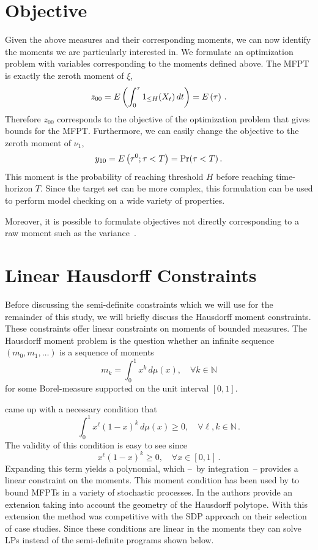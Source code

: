 \section{Objective}
Given the above measures and their corresponding moments, we can
now identify the moments we are particularly interested in.
We formulate an optimization problem with variables corresponding 
to the moments defined above.
The \ac{MFPT} is exactly the zeroth moment of $\xi$,
\[
	z_{00}={E}\left(\int_0^{\tau}1_{\leq H}(X_t)\,dt\right) = {E}\left(\tau\right)\,.
\]
Therefore $z_{00}$ corresponds to the objective of the optimization problem
that gives bounds for the \ac{MFPT}.
Furthermore, we can easily change the objective to the  
zeroth moment of $\nu_1$,
\[
	y_{10} = {E}\left(\tau^0;\tau<T\right)=\Pr(\tau < T)\,.
\]
This moment is the probability of reaching
threshold $H$ before reaching time-horizon $T$. Since the target set can be more complex, this formulation can be used to perform model checking on a
wide variety of properties.

Moreover, it is possible to formulate objectives not directly corresponding to
a raw moment such as the variance~\parencite{sakurai2019bounding,dowdy2018bounds}.

\section{Linear Hausdorff Constraints}
Before discussing the semi-definite constraints which we will use for the remainder of this study, we will briefly discuss the Hausdorff moment constraints.
These constraints offer linear constraints on moments of bounded measures.
The Hausdorff moment problem is the question whether an infinite sequence $(m_0, m_1, \dotsc)$ is a sequence of moments
\[
	m_k = \int_{0}^{1} x^k\,d\mu(x), \quad \forall k\in\mathbb{N}
\]
for some Borel-measure supported on the unit interval $[0,1]$.

\citet{hausdorff} came up with a necessary condition that
\begin{equation}\label{eq:hausdorff}
    \int_0^1 x^\ell(1-x)^k\,d\mu(x) \geq 0, \quad \forall \ell, k\in\mathbb{N}\,.
\end{equation}
The validity of this condition is easy to see since
\begin{equation}\label{eq:hausdorff_integrand}
	x^\ell(1-x)^k\geq 0, \quad \forall x\in[0,1]\,.
\end{equation}
Expanding this term yields a polynomial, which --~by integration~-- provides a linear constraint on the moments.
This moment condition has been used by \citet{helmes2001computing} to bound \acp{MFPT} in a variety of stochastic processes.
In \citet{helmes2008geometrical} the authors provide an extension taking into account the geometry of the Hausdorff polytope.
With this extension the method was competitive with the \ac{SDP} approach on their selection of case studies.
Since these conditions are linear in the moments they can solve \acp{LP} instead of the semi-definite programs shown below.

